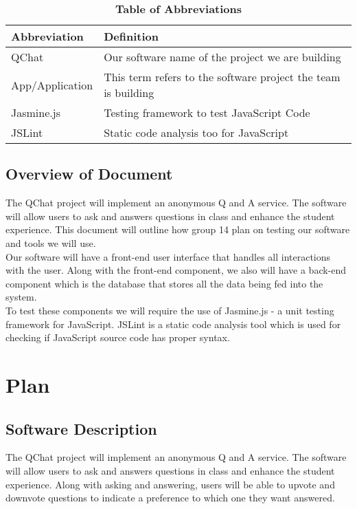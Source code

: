 \documentclass[12pt, titlepage]{article}
\begin{document}
\begin{table}[hbp]
\caption{\textbf{Table of Abbreviations}} \label{Table}

\begin{tabularx}{\textwidth}{p{3cm}X}
\toprule
\textbf{Abbreviation} & \textbf{Definition} \\
\midrule
QChat & Our software name of the project we are building\\
App/Application & This term refers to the software project the team is building\\
Jasmine.js & Testing framework to test JavaScript Code\\
JSLint & Static code analysis too for JavaScript\\

\bottomrule
\end{tabularx}

\end{table}

\subsection{Overview of Document}

The QChat project will implement an anonymous Q and A service. The software will allow users to ask and answers questions in class and enhance the student experience. This document will outline how group 14 plan on testing our software and tools we will use. \\

Our software will have a front-end user interface that handles all interactions with the user. Along with the front-end component, we also will have a back-end component which is the database that stores all the data being fed into the system. \\

To test these components we will require the use of Jasmine.js - a unit testing framework for JavaScript. JSLint is a static code analysis tool which is used for checking if JavaScript source code has proper syntax. \\

\section{Plan}
	
\subsection{Software Description}
The QChat project will implement an anonymous Q and A service. The software will allow users to ask and answers questions in class and enhance the student experience. Along with asking and answering, users will be able to upvote and downvote questions to indicate a preference to which one they want answered. 
\end{document}
